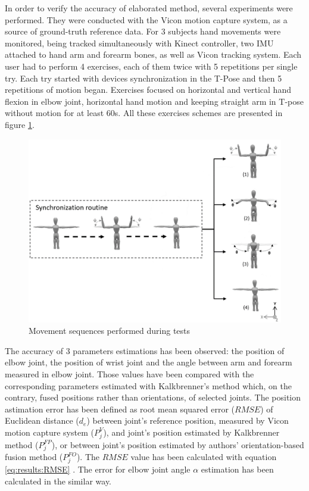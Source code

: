 \documentclass[sensors,article,submit,moreauthors,pdftex,10pt,a4paper]{mdpi}
\begin{document}
In order to verify the accuracy of elaborated method, several experiments were performed. They were conducted with the Vicon motion capture system, as a source of ground-truth reference data. For 3 subjects hand movements were monitored, being tracked simultaneously with Kinect controller, two IMU attached to hand arm and forearm bones, as well as Vicon tracking system. Each user had to perform 4 exercises, each of them twice with 5 repetitions per single try. Each try started with devices synchronization in the T-Pose and then 5 repetitions of motion began. Exercises focused on horizontal and vertical hand flexion in elbow joint, horizontal hand motion and keeping straight arm in T-pose without motion for at least 60s. All these exercises schemes are presented in figure \ref{fig:results:sequences}.

\begin{figure}[H]
	\centering
	\includegraphics[width=12cm]{Figure8.png}
	\caption{Movement sequences performed during tests}
	\label{fig:results:sequences}
\end{figure}

The accuracy of 3 parameters estimations has been observed: the position of elbow joint, the position of wrist joint and the angle between arm and forearm measured in elbow joint. Those values have been compared with the corresponding parameters estimated with Kalkbrenner’s method \cite{Kalkbrenner2014} which, on the contrary, fused positions rather than orientations, of selected joints. The position astimation error has been defined as root mean squared error ($RMSE$) of Euclidean distance ($d_e$) between joint’s reference position, measured by Vicon motion capture system ($P_j^V$), and joint’s position estimated by Kalkbrenner method ($P_j^{FP}$), or between joint’s position estimated by authors’ orientation-based fusion method ($P_j^{FO}$). The $RMSE$ value has been calculated with equation \ref{eq:results:RMSE} \cite{Armstrong1992}. The error for elbow joint angle $\alpha$ estimation has been calculated in the similar way.
\end{document}
